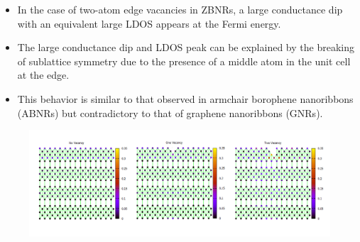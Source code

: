 \documentclass[handout,t]{beamer}
\begin{document}
\begin{frame}
	\begin{itemize}
		\item  In the case of two-atom edge vacancies in ZBNRs, a large conductance dip with an equivalent large LDOS appears at the Fermi energy. 
		\item The large conductance dip and LDOS peak can be explained by the breaking of sublattice symmetry due to the presence of a middle atom in the unit cell at the edge.
		\item  This behavior is similar to that observed in armchair borophene nanoribbons (ABNRs) but contradictory to that of graphene nanoribbons (GNRs).
	\end{itemize}
	\begin{figure}[!ht]
		\centering
		\includegraphics[width=1\linewidth]{../figures/Slide4.PNG}
		\label{zigVSLDOS}
	\end{figure}
\end{frame}
\end{document}
